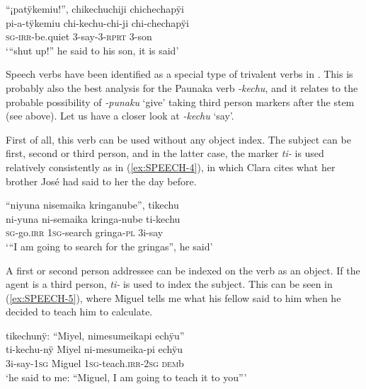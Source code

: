 \ea\label{ex:SPEECH-1}
\begingl 
\glpreamble “¡patÿkemiu!”, chikechuchiji chichechapÿi\\
\gla pi-a-tÿkemiu chi-kechu-chi-ji chi-chechapÿi\\ 
\textsc{sg}-\textsc{irr}-be.quiet 3-say-3-\textsc{rprt} 3-son\\ 
\glft ‘“shut up!” he said to his son, it is said’\\ 
\endgl
\trailingcitation{[jxx-p120430l-2.181]}
\xe

Speech verbs have been identified as a special type of trivalent verbs in  \citep[]{Rose2011b}. This is probably also the best analysis for the Paunaka verb \textit{-kechu}, and it relates to the probable possibility of \textit{-punaku} ‘give’ taking third person markers after the stem (see above). Let us have a closer look at \textit{-kechu} ‘say’.

First of all, this verb can be used without any object index. The subject can be first, second or third person, and in the latter case, the marker \textit{ti-} is used relatively consistently as in (\ref{ex:SPEECH-4}), in which Clara cites what her brother José had said to her the day before.

\ea\label{ex:SPEECH-4}
\begingl
\glpreamble “niyuna nisemaika kringanube”, tikechu\\
\gla ni-yuna ni-semaika kringa-nube ti-kechu\\
\textsc{sg}-go.\textsc{irr} 1\textsc{sg}-search gringa-\textsc{pl} 3i-say\\
\glft ‘“I am going to search for the gringas”, he said’
\endgl
\trailingcitation{[cux-c120510l-1.127]}
\xe


A first or second person addressee can be indexed on the verb as an object. If the agent is a third person, \textit{ti-} is used to index the subject. This can be seen in (\ref{ex:SPEECH-5}), where Miguel tells me what his fellow said to him when he decided to teach him to calculate.

\ea\label{ex:SPEECH-5}
\begingl
\glpreamble tikechunÿ: “Miyel, nimesumeikapi echÿu”\\
\gla ti-kechu-nÿ Miyel ni-mesumeika-pi echÿu\\
\glb 3i-say-1\textsc{sg} Miguel 1\textsc{sg}-teach.\textsc{irr}-2\textsc{sg} \textsc{dem}b\\
\glft ‘he said to me: “Miguel, I am going to teach it to you”’
\endgl
\trailingcitation{[mxx-p181027l-1.119]}
\xe

